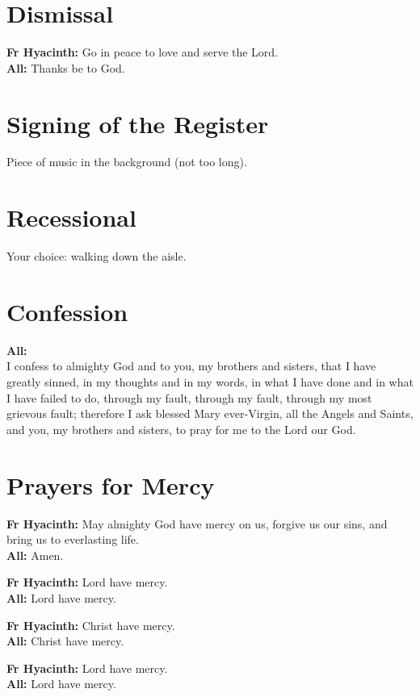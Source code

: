 \documentclass[12pt,landscape]{article}
\begin{document}
\newpage
\begin{multicols}{2}

\section*{Dismissal}
\textbf{Fr Hyacinth:} Go in peace to love and serve the Lord.\\[0.5em]
\textbf{All:} Thanks be to God.

\section*{Signing of the Register}
Piece of music in the background (not too long).

\section*{Recessional}
Your choice: walking down the aisle.

\columnbreak

\section*{Confession}
\textbf{All:}\\
I confess to almighty God and to you, my brothers and sisters, that I have greatly sinned, in my thoughts and in my words, in what I have done and in what I have failed to do, through my fault, through my fault, through my most grievous fault; therefore I ask blessed Mary ever-Virgin, all the Angels and Saints, and you, my brothers and sisters, to pray for me to the Lord our God.

\section*{Prayers for Mercy}
\textbf{Fr Hyacinth:} May almighty God have mercy on us, forgive us our sins, and bring us to everlasting life.\\[0.5em]
\textbf{All:} Amen.

\textbf{Fr Hyacinth:} Lord have mercy.\\
\textbf{All:} Lord have mercy.

\textbf{Fr Hyacinth:} Christ have mercy.\\
\textbf{All:} Christ have mercy.

\textbf{Fr Hyacinth:} Lord have mercy.\\
\textbf{All:} Lord have mercy.

\end{multicols}
\end{document}
